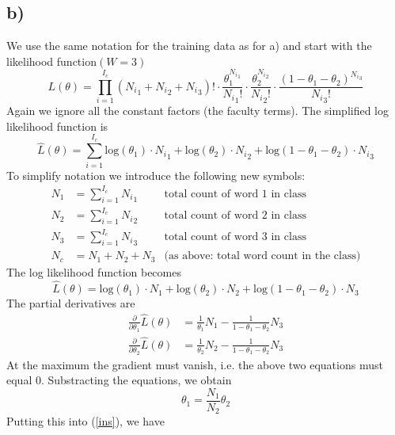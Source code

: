 \documentclass[%
   11pt,              %
   ngerman,           %
   a4paper,           %
   DIV11,             %
]{scrartcl}%
\begin{document}
\subsection*{b)}
We use the same notation for the training data as for a) and start with the likelihood function$(W = 3)$
\begin{equation*}
	L(\theta) = \prod_{i=1}^{I_c} ({N_i}_1 + {N_i}_2 + {N_i}_3)! \cdot \frac{\theta_1^{{N_i}_1}}{{N_i}_1 !} \cdot \frac{\theta_2^{{N_i}_2}}{{N_i}_2 !} \cdot \frac{(1 - \theta_1 - \theta_2)^{{N_i}_3}}{{N_i}_3 !}
\end{equation*}
Again we ignore all the constant factors (the faculty terms). The simplified log likelihood function is
\begin{equation*}
	\hat{L}(\theta) = \sum_{i=1}^{I_c} \text{log}(\theta_1) \cdot {N_i}_1 + \text{log}(\theta_2) \cdot {N_i}_2 + \text{log}(1 - \theta_1 - \theta_2) \cdot {N_i}_3
\end{equation*}
To simplify notation we introduce the following new symbols:
\begin{align}\label{symb}
	N_1 &= \sum_{i=1}^{I_c} {N_i}_1 &\text{total count of word 1 in class}\\
	N_2 &= \sum_{i=1}^{I_c} {N_i}_2 &\text{total count of word 2 in class}\\
	N_3 &= \sum_{i=1}^{I_c} {N_i}_3 &\text{total count of word 3 in class}\\
	N_c &= N_1 + N_2 + N_3 &\text{(as above: total word count in the class)}
\end{align}
The log likelihood function becomes
\begin{equation*}
	\hat{L}(\theta) = \text{log}(\theta_1) \cdot N_1 + \text{log}(\theta_2) \cdot N_2 + \text{log}(1 - \theta_1 - \theta_2) \cdot N_3
\end{equation*}
The partial derivatives are
\begin{align}\label{ins}
	\frac{\partial}{\partial \theta_1} \hat{L}(\theta) &= \frac{1}{\theta_1}N_1 - \frac{1}{1 - \theta_1 - \theta_2} N_3\\
	\frac{\partial}{\partial \theta_2} \hat{L}(\theta) &= \frac{1}{\theta_2}N_2 - \frac{1}{1 - \theta_1 - \theta_2} N_3 
\end{align}
At the maximum the gradient must vanish, i.e. the above two equations must equal 0. Substracting the equations, we obtain
\begin{equation}\label{fin}
	\theta_1 = \frac{N_1}{N_2}\theta_2
\end{equation}
Putting this into (\ref{ins}), we have
\end{document}
